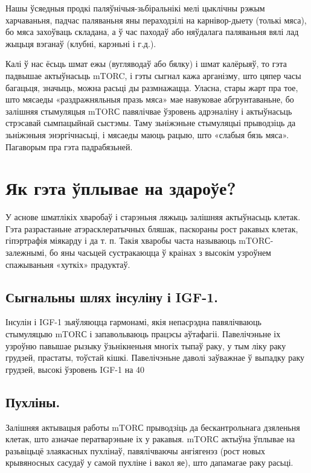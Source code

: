 Нашы ўсяедныя продкі паляўнічыя-зьбіральнікі мелі цыклічны рэжым харчаваньня, падчас паляваньня яны пераходзілі на карнівор-дыету (толькі мяса), бо мяса захоўваць складана, а ў час паходаў або няўдалага паляваньня вялі лад жыцьця вэганаў (клубні, карэньні і г.д.).

Калі ў нас ёсьць шмат ежы (вугляводаў або бялку) і шмат калёрыяў, то гэта падвышае актыўнасьць mTORC, і гэты сыгнал кажа арганізму, што цяпер часы багацьця, значыць, можна расьці ды размнажацца. Уласна, стары жарт пра тое, што мясаеды «раздражняльныя празь мяса» мае навуковае абгрунтаваньне, бо залішняя стымуляцыя mTORС павялічвае ўзровень адрэналіну і актыўнасьць стрэсавай сымпацыйнай сыстэмы. Таму зьніжэньне стымуляцыі прыводзіць да зьніжэньня энэргічнасьці, і мясаеды маюць рацыю, што «слабыя бязь мяса». Пагаворым пра гэта падрабязьней.

\section{Як гэта ўплывае на здароўе?}

У аснове шматлікіх хваробаў і старэньня ляжыць залішняя актыўнасьць клетак. Гэта разрастаньне атэрасклератычных бляшак, паскораны рост ракавых клетак, гіпэртрафія міякарду і да т. п. Такія хваробы часта называюць mTORС-залежнымі, бо яны часьцей сустракаюцца ў краінах з высокім узроўнем спажываньня «хуткіх» прадуктаў.

\subsection{Сыгнальны шлях інсуліну і IGF-1.}
Інсулін і IGF-1 зьяўляюцца гармонамі, якія непасрэдна павялічваюць стымуляцыю mTORС і запавольваюць працэсы аўтафагіі. Павелічэньне іх узроўню павышае рызыку ўзьнікненьня многіх тыпаў раку, у тым ліку раку грудзей, прастаты, тоўстай кішкі. Павелічэньне даволі заўважнае ў выпадку раку грудзей, высокі ўзровень IGF-1 на 40%

\subsection{Пухліны.}
Залішняя актывацыя работы mTORС прыводзіць да бескантрольнага дзяленьня клетак, што азначае ператварэньне іх у ракавыя. mTORС актыўна ўплывае на разьвіцьцё злаякасных пухлінаў, павялічваючы ангіягенэз (рост новых крывяносных сасудаў у самой пухліне і вакол яе), што дапамагае раку расьці.

